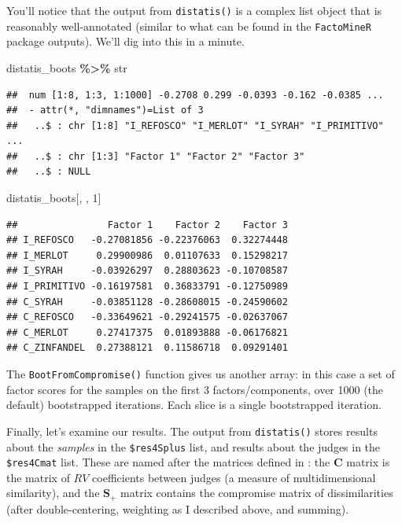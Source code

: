 \documentclass[
]{book}
\newenvironment{Shaded}{\begin{snugshade}}{\end{snugshade}}
\newcommand{\DecValTok}[1]{\textcolor[rgb]{0.00,0.00,0.81}{#1}}
\newcommand{\NormalTok}[1]{#1}
\newcommand{\SpecialCharTok}[1]{\textcolor[rgb]{0.81,0.36,0.00}{\textbf{#1}}}
\begin{document}
You'll notice that the output from \texttt{distatis()} is a complex list object that is reasonably well-annotated (similar to what can be found in the \texttt{FactoMineR} package outputs). We'll dig into this in a minute.

\begin{Shaded}
\begin{Highlighting}[]
\NormalTok{distatis\_boots }\SpecialCharTok{\%\textgreater{}\%}\NormalTok{ str}
\end{Highlighting}
\end{Shaded}

\begin{verbatim}
##  num [1:8, 1:3, 1:1000] -0.2708 0.299 -0.0393 -0.162 -0.0385 ...
##  - attr(*, "dimnames")=List of 3
##   ..$ : chr [1:8] "I_REFOSCO" "I_MERLOT" "I_SYRAH" "I_PRIMITIVO" ...
##   ..$ : chr [1:3] "Factor 1" "Factor 2" "Factor 3"
##   ..$ : NULL
\end{verbatim}

\begin{Shaded}
\begin{Highlighting}[]
\NormalTok{distatis\_boots[, , }\DecValTok{1}\NormalTok{]}
\end{Highlighting}
\end{Shaded}

\begin{verbatim}
##                Factor 1    Factor 2    Factor 3
## I_REFOSCO   -0.27081856 -0.22376063  0.32274448
## I_MERLOT     0.29900986  0.01107633  0.15298217
## I_SYRAH     -0.03926297  0.28803623 -0.10708587
## I_PRIMITIVO -0.16197581  0.36833791 -0.12750989
## C_SYRAH     -0.03851128 -0.28608015 -0.24590602
## C_REFOSCO   -0.33649621 -0.29241575 -0.02637067
## C_MERLOT     0.27417375  0.01893888 -0.06176821
## C_ZINFANDEL  0.27388121  0.11586718  0.09291401
\end{verbatim}

The \texttt{BootFromCompromise()} function gives us another array: in this case a set of factor scores for the samples on the first 3 factors/components, over 1000 (the default) bootstrapped iterations. Each slice is a single bootstrapped iteration.

Finally, let's examine our results. The output from \texttt{distatis()} stores results about the \emph{samples} in the \texttt{\$res4Splus} list, and results about the judges in the \texttt{\$res4Cmat} list. These are named after the matrices defined in \citet{abdiAnalyzing2007}: the \(\mathbf{C}\) matrix is the matrix of \(RV\) coefficients between judges (a measure of multidimensional similarity), and the \(\mathbf{S_+}\) matrix contains the compromise matrix of dissimilarities (after double-centering, weighting as I described above, and summing).
\end{document}
